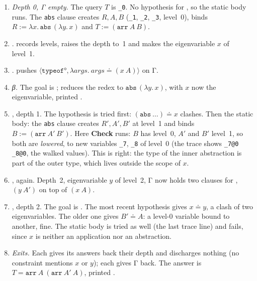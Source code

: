 \begin{tutorial}
\begin{enumerate}
  \item \emph{Depth 0, Γ empty.} The query $T$ is \texttt{\_0}. No hypothesis for , so the static
    body runs. The \texttt{abs} clause creates $R,A,B$ (\texttt{\_1}, \texttt{\_2}, \texttt{\_3}, level~0),
    binds $R := \lambda x.\,\mathtt{abs}\,(\lambda y.\,x)$ and $T := (\mathtt{arr}\ A\ B)$.
  \item {}.  records levels, raises the depth to~1 and makes the eigenvariable $x$ of
    level~1.
  \item {}.  pushes $\langle\texttt{typeof°}, \lambda\mathit{args}.\ \mathit{args} \doteq (x\ A)\rangle$ on Γ.
  \item \emph{β.} The goal is ;  reduces the redex to
    $\mathtt{abs}\,(\lambda y.\,x)$, with $x$ now the eigenvariable, printed .
  \item {}, depth 1. The hypothesis is tried first: $(\mathtt{abs}\ \dots) \doteq x$ clashes.
    Then the static body: the \texttt{abs} clause creates $R',A',B'$ at level~1 and binds
    $B := (\mathtt{arr}\ A'\ B')$. Here \textbf{Check} runs: $B$ has level~0, $A'$ and $B'$ level~1, so both are
    \emph{lowered}, to new variables \texttt{\_7}, \texttt{\_8} of level~0 (the trace shows
    \texttt{\_7@0 \_8@0}, the walked values). This is right: the type of the inner abstraction is part of the
    outer type, which lives outside the scope of $x$.
  \item {},  again. Depth~2, eigenvariable $y$ of level~2, Γ now holds two clauses for
    , $(y\ A')$ on top of $(x\ A)$.
  \item {}, depth 2. The goal is . The most recent hypothesis gives
    $x \doteq y$, a clash of two eigenvariables. The older one gives $B' \doteq A$: a level-0 variable bound to
    another, fine. The static body is tried as well (the last trace line) and fails, since $x$ is neither an
    application nor an abstraction.
  \item \emph{Exits.} Each  gives its answers back their depth and discharges nothing (no constraint
    mentions $x$ or $y$); each  gives Γ back. The answer is
    $T = \mathtt{arr}\ A\ (\mathtt{arr}\ A'\ A)$, printed .
\end{enumerate}
\end{tutorial}


